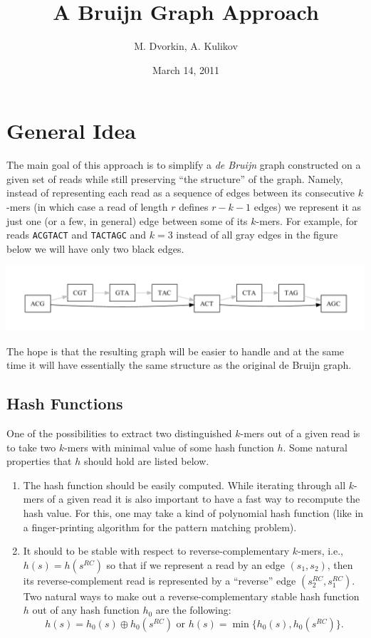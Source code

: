 \documentclass[12pt]{article}
\begin{document}
\author{M. Dvorkin, A. Kulikov}
\title{A Bruijn Graph Approach}
\date{March 14, 2011}
\maketitle

\listoftodos

\section{General Idea}

The main goal of this approach is to simplify a \emph{de Bruijn} graph
constructed on a given set of reads while still preserving 
``the structure'' of the graph. Namely, instead 
of representing each read as a sequence of edges 
between its consecutive $k$-mers (in which case a read of length $r$ defines
$r-k-1$ edges) we represent it as just one (or a few, in general)
edge between some of its $k$-mers. For example, for 
reads {\tt ACGTACT} and {\tt TACTAGC} and $k=3$
instead of all gray edges in the figure below we will have 
only two black edges.
\begin{center}
\includegraphics[width=\textwidth]{fig1.pdf}
\end{center}
The hope is that the resulting graph will be easier to handle 
and at the same time it will have essentially the same structure 
as the original de Bruijn graph.

\subsection{Hash Functions}

One of the possibilities to extract two distinguished $k$-mers out of a given
read is to take two $k$-mers with minimal value of some hash function $h$.
Some natural properties that $h$ should hold are listed below.
\begin{enumerate}
  \item The hash function should be easily computed.
  While iterating through all $k$-mers of a given read
  it is also important to have a fast way to recompute 
  the hash value. For this, one may take a kind of polynomial
  hash function (like in a finger-printing algorithm for the pattern 
  matching problem).
  \item It should to be stable with respect to reverse-complementary 
  $k$-mers, i.e., $h(s) = h(s^{RC})$ so that if we represent a read
  by an edge $(s_1,s_2)$, then its reverse-complement read is represented by 
  a ``reverse'' edge $(s_2^{RC},s_1^{RC})$. Two natural ways to make out a
  reverse-complementary stable hash function $h$ out of any hash function 
  $h_0$ are the following:
  \[h(s) = h_0(s) \oplus h_0(s^{RC}) \textrm{ or } h(s) = \min\{h_0(s), h_0(s^{RC})\} .\]
\end{enumerate}
\end{document}
